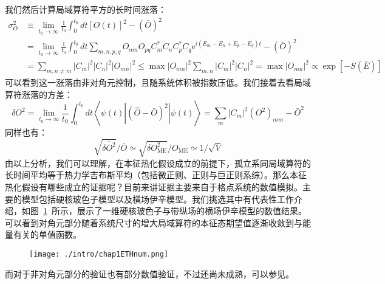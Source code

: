 我们然后计算局域算符平方的长时间涨落：
\begin{equation}
\begin{aligned}
\sigma_{O}^{2} & \equiv \lim _{t_{0} \rightarrow \infty} \frac{1}{t_{0}} \int_{0}^{t_{0}} d t[O(t)]^{2}-(\bar{O})^{2} \\
&=\lim _{t_{0} \rightarrow \infty} \frac{1}{t_{0}} \int_{0}^{t_{0}} d t \sum_{m, n, p, q} O_{m n} O_{p q} C_{m}^{*} C_{n} C_{p}^{*} C_{q} \mathrm{e}^{i\left(E_{m}-E_{n}+E_{p}-E_{q}\right) t}-(\bar{O})^{2} \\
&=\sum_{m, n \neq m}\left|C_{m}\right|^{2}\left|C_{n}\right|^{2}\left|O_{m n}\right|^{2} \leq \max \left|O_{m n}\right|^{2} \sum_{m, n}\left|C_{m}\right|^{2}\left|C_{n}\right|^{2}=\max \left|O_{m n}\right|^{2} \propto \exp [-S(\bar{E})]
\end{aligned}
\end{equation}
可以看到这一涨落由非对角元控制，且随系统体积被指数压低。我们接着去看局域算符涨落的方差：
\begin{equation}
\overline{\delta O^{2}}=\lim _{t_{0} \rightarrow \infty} \frac{1}{t_{0}} \int_{0}^{t_{0}} d t\left\langle\psi(t)\left|(\hat{O}-\bar{O})^{2}\right| \psi(t)\right\rangle=\sum_{m}\left|C_{m}\right|^{2}\left(O^{2}\right)_{m m}-\bar{O}^{2}
\end{equation}
同样也有：
\begin{equation}
\sqrt{\overline{\delta O^{2}}} / \bar{O} \simeq \sqrt{\delta O_{\mathrm{ME}}^{2}} / O_{\mathrm{ME}} \simeq 1 / \sqrt{V}
\end{equation}
由以上分析，我们可以理解，在本征热化假设成立的前提下，孤立系同局域算符的长时间平均等于热力学吉布斯平均（包括微正则、正则与巨正则系综）。那么本征热化假设有哪些成立的证据呢？目前来讲证据主要来自于格点系统的数值模拟。主要的模型包括硬核玻色子模型\cite{rigol2008thermalization,Santos2010Localization,Rigol2009Breakdown,Rigol2010Quantum,Neuenhahn2012Thermalization,Steinigeweg2013Eigenstate,Kim2014testing,beugeling2014finite,Steinigeweg2014Pushing,Khodja2015Relevance,Beugeling2015Off-diagonal,}以及横场伊辛模型\cite{Fratus2015Eigenstate,Mondaini2016Eigenstate,Mondaini2017Eigenstate,blass2016test,basko2006problem,Serbyn2013local,}。我们挑选其中有代表性工作介绍，如图~\ref{ETHnum}~所示，展示了一维硬核玻色子与带纵场的横场伊辛模型的数值结果\cite{Kim2014testing}。可以看到对角元部分随着系统尺寸的增大局域算符的本征态期望值逐渐收敛到与能量有关的单值函数。
\begin{figure}[!htbp]
    \centering
    \texttt{[image: ./intro/chap1ETHnum.png]}
    \label{ETHnum}
\end{figure}
而对于非对角元部分的验证也有部分数值验证，不过还尚未成熟，可以参见\cite{Beugeling2015Off-diagonal,Mondaini2017Eigenstate}。

